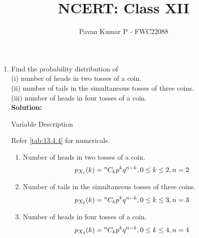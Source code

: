 \documentclass{article}
\newcommand{\solution}{\noindent \textbf{Solution: }}
\newcommand*{\permcomb}[4][0mu]{{{}^{#3}\mkern#1#2_{#4}}}
\newcommand*{\comb}[1][-1mu]{\permcomb[#1]{C}}
\begin{document}
\title{NCERT: Class XII}
\author{\Large Pavan Kumar P - FWC22088}
\date{}

\maketitle

\begin{enumerate}[label=13.\arabic{enumi}.\arabic{enumii}]

\setcounter{enumi}{3}
\setcounter{enumii}{4}

\item Find the probability distribution of\\
(i) number of heads in two tosses of a coin.\\
(ii) number of tails in the simultaneous tosses of three coins.\\
(iii) number of heads in four tosses of a coin.\\[1ex]
\solution
\begin{table}[h]
 \centering
	
	\caption{Variable Description }
	\label{tab:13.4.4}
\end{table}
 
Refer \ref{tab:13.4.4} for numericals.
\begin{enumerate} 
\item Number of heads in two tosses of a coin.
 \begin{align}
  p_{X_1}(k) &= \comb{n}{k}p^{k}q^{n-k},  0\leq k\leq 2,n=2
\end{align}

\item Number of tails in the simultaneous tosses of three coins.
 \begin{align}
  p_{X_2}(k) &= \comb{n}{k}p^{k}q^{n-k},  0\leq k\leq 3,n=3 
\end{align}

\item Number of heads in four tosses of a coin.
 \begin{align}
  p_{X_3}(k) &= \comb{n}{k}p^{k}q^{n-k},  0\leq k\leq 4,n=4
\end{align}

\end{enumerate}
\end{enumerate}
\end{document}
